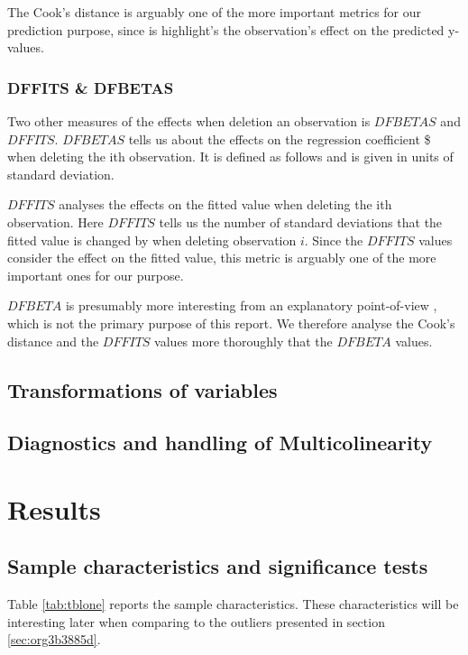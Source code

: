 \documentclass[11pt]{article}
\begin{document}
The Cook's distance is arguably one of the more important metrics for our prediction purpose, since is highlight's
the observation's effect on the predicted y-values. \cite{22286}

\subsubsection{DFFITS \& DFBETAS}
\label{sec:org575fd89}

Two other measures of the effects when deletion an observation is \(DFBETAS\) and \(DFFITS\). \(DFBETAS\) tells us
about the effects on the regression coefficient \$ when deleting the ith observation. It is defined as
follows and is given in units of standard deviation.

\(DFFITS\) analyses the effects on the fitted value when deleting the ith observation. Here \(DFFITS\) tells us
the number of standard deviations that the fitted value is changed by when deleting observation \(i\). Since 
the \(DFFITS\) values consider the effect on the fitted value, this metric is arguably one of the more important 
ones for our purpose.

\(DFBETA\) is presumably more interesting from an explanatory point-of-view \cite{22286}, which is not the
primary purpose of this report. We therefore analyse the Cook's distance and the \(DFFITS\) values more
thoroughly that the \(DFBETA\) values.

\subsection{Transformations of variables}
\label{sec:orga71c173}
\subsection{Diagnostics and handling of Multicolinearity}
\label{sec:orgc938b7f}
\newpage
\section{Results}
\label{sec:org84d92df}
\subsection{Sample characteristics and significance tests}
\label{sec:org5b4fd5a}

Table \ref{tab:tblone} reports the sample characteristics. These characteristics will be interesting later
when comparing to the outliers presented in section \ref{sec:org3b3885d}.
\end{document}
